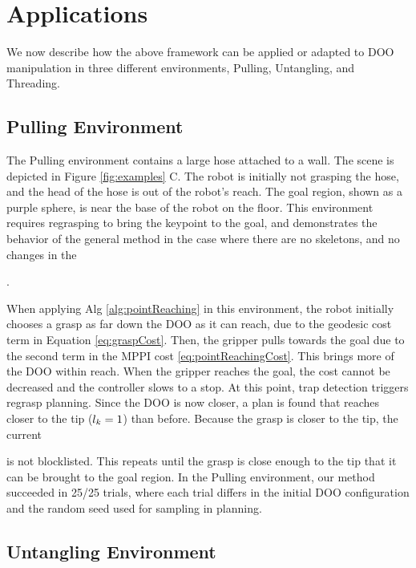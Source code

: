 \section{Applications}
\label{chap5:sec:applications}

We now describe how the above framework can be applied or adapted to DOO manipulation in three different environments, Pulling, Untangling, and Threading.

\subsection{Pulling Environment}

The Pulling environment contains a large hose attached to a wall. The scene is depicted in Figure \ref{fig:examples} C. The robot is initially not grasping the hose, and the head of the hose is out of the robot's reach. The goal region, shown as a purple sphere, is near the base of the robot on the floor. This environment requires regrasping to bring the keypoint to the goal, and demonstrates the behavior of the general method in the case where there are no skeletons, and no changes in the \signature{}.

When applying Alg \ref{alg:pointReaching} in this environment, the robot initially chooses a grasp as far down the DOO as it can reach, due to the geodesic cost term in Equation \ref{eq:graspCost}. Then, the gripper pulls towards the goal due to the second term in the MPPI cost \eqref{eq:pointReachingCost}. This brings more of the DOO within reach. When the gripper reaches the goal, the cost cannot be decreased and the controller slows to a stop. At this point, trap detection triggers regrasp planning. Since the DOO is now closer, a plan is found that reaches closer to the tip ($l_k=1$) than before. Because the grasp is closer to the tip, the current \signature{} is not blocklisted. This repeats until the grasp is close enough to the tip that it can be brought to the goal region. In the Pulling environment, our method succeeded in 25/25 trials, where each trial differs in the initial DOO configuration and the random seed used for sampling in planning.

\subsection{Untangling Environment}

